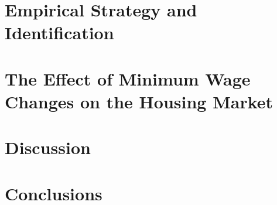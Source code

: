 \documentclass{article}
\begin{document}
\section{Empirical Strategy and Identification}\label{sec:empirical_strategy}
    

\section{The Effect of Minimum Wage Changes on the Housing Market}\label{sec:results}
    

\section{Discussion}\label{sec:discussion}
	

\section{Conclusions}\label{sec:conclusion}
    



\clearpage
\printbibliography


\clearpage

\section*{}
\vspace{5mm}

\appendix

\renewcommand\thetable{\thesection.\arabic{table}}    
\renewcommand\thefigure{\thesection.\arabic{figure}} 
\setcounter{table}{0}
\setcounter{figure}{0}


\end{document}
